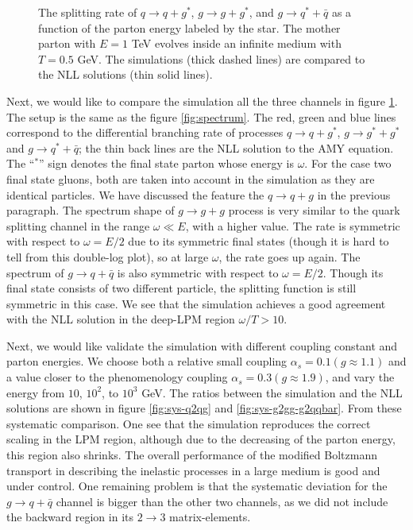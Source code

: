 \begin{figure}
\caption{The splitting rate of $q\rightarrow q+g^*$, $g\rightarrow g+g^*$, and $g\rightarrow q^* + \bar{q}$ as a function of the parton energy labeled by the star. The mother parton with $E=1$ TeV evolves inside an infinite medium with $T=0.5$ GeV. The simulations (thick dashed lines) are compared to the NLL solutions (thin solid lines).}
\label{fig:channel_rate}
\end{figure}

Next, we would like to compare the simulation all the three channels in figure \ref{fig:channel_rate}.
The setup is the same as the figure \ref{fig:spectrum}.
The red, green and blue lines correspond to the differential branching rate of processes $q\rightarrow q+g^*$, $g\rightarrow g^*+g^*$ and $g\rightarrow q^*+\bar{q}$; the thin back lines are the NLL solution to the AMY equation.
The ``${}^*$'' sign denotes the final state parton whose energy is $\omega$.
For the case two final state gluons, both are taken into account in the simulation as they are identical particles.
We have discussed the feature the $q\rightarrow q+g$ in the previous paragraph. 
The spectrum shape of $g\rightarrow g+g$ process is very similar to the quark splitting channel in the range $\omega \ll E$, with a higher value.
The rate is symmetric with respect to $\omega = E/2$ due to its symmetric final states (though it is hard to tell from this double-log plot), so at large $\omega$, the rate goes up again.
The spectrum of $g\rightarrow q+\bar{q}$ is also symmetric with respect to $\omega = E/2$.
Though its final state consists of two different particle, the splitting function is still symmetric in this case.
We see that the simulation achieves a good agreement with the NLL solution in the deep-LPM region $\omega/T > 10$.

Next, we would like validate the simulation with different coupling constant and parton energies.
We choose both a relative small coupling $\alpha_s = 0.1 (g \approx 1.1)$ and a value closer to the phenomenology coupling $\alpha_s = 0.3 (g \approx 1.9)$, and vary the energy from $10$, $10^2$, to $10^3$ GeV.
The ratios between the simulation and the NLL solutions are shown in figure \ref{fig:sys-q2qg} and \ref{fig:sys-g2gg-g2qqbar}.
From these systematic comparison.
One see that the simulation reproduces the correct scaling in the LPM region, although due to the decreasing of the parton energy, this region also shrinks.
The overall performance of the modified Boltzmann transport in describing the inelastic processes in a large medium is good and under control.
One remaining problem is that the systematic deviation for the $g\rightarrow q+\bar{q}$ channel is bigger than the other two channels, as we did not include the backward region in its $2\rightarrow 3$ matrix-elements.



